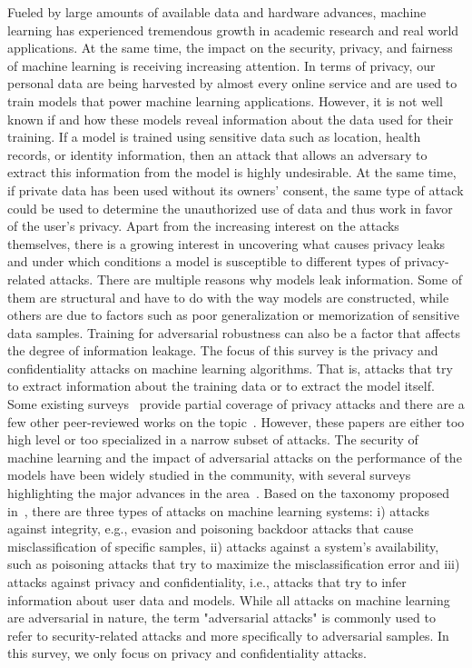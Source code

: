 

Fueled by large amounts of available data and hardware advances, machine learning has experienced tremendous growth in academic research and real world applications. At the same time, the impact on the security, privacy, and fairness of machine learning is receiving increasing attention. In terms of privacy, our personal data are being harvested by almost every online service and are used to train models that power machine learning applications. However, it is not well known if and how these models reveal information about the data used for their training. If a model is trained using sensitive data such as location, health records, or identity information, then an attack that allows an adversary to extract this information from the model is highly undesirable. At the same time, if private data has been used without its owners' consent, the same type of attack could be used to determine the unauthorized use of data and thus work in favor of the user's privacy. 
Apart from the increasing interest on the attacks themselves, there is a growing interest in uncovering what causes privacy leaks and under which conditions a model is susceptible to different types of privacy-related attacks. There are multiple reasons why models leak information. Some of them are structural and have to do with the way models are constructed, while others are due to factors such as poor generalization or memorization of sensitive data samples. Training for adversarial robustness can also be a factor that affects the degree of information leakage.  
The focus of this survey is the privacy and confidentiality attacks on machine learning algorithms. That is, attacks that try to extract information about the training data or to extract the model itself. Some existing surveys~ provide partial coverage of privacy attacks and there are a few other peer-reviewed works on the topic~. However, these papers are either too high level or too specialized in a narrow subset of attacks.
The security of machine learning and the impact of adversarial attacks on the performance of the models have been widely studied in the community, with several surveys highlighting the major advances in the area~. Based on the taxonomy proposed in~, there are three types of attacks on machine learning systems: i) attacks against integrity, e.g., evasion and poisoning backdoor attacks that cause misclassification of specific samples, ii) attacks against a system's availability, such as poisoning attacks that try to maximize the misclassification error and iii) attacks against privacy and confidentiality, i.e., attacks that try to infer information about user data and models. While all attacks on machine learning are adversarial in nature, the term "adversarial attacks" is commonly used to refer to security-related attacks and more specifically to adversarial samples. In this survey, we only focus on privacy and confidentiality attacks.
